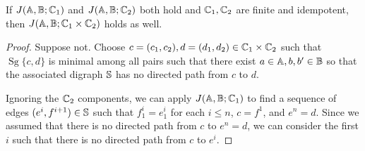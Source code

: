 \documentclass[letterpaper,11pt]{article}
\DeclareMathOperator{\Sg}{Sg}
\begin{document}
\begin{lem} If $J(\mathbb{A},\mathbb{B};\mathbb{C}_1)$ and $J(\mathbb{A},\mathbb{B};\mathbb{C}_2)$ both hold and $\mathbb{C}_1, \mathbb{C}_2$ are finite and idempotent, then $J(\mathbb{A},\mathbb{B};\mathbb{C}_1\times\mathbb{C}_2)$ holds as well.
\end{lem}
\begin{proof} Suppose not. Choose $c = (c_1,c_2), d = (d_1,d_2) \in \mathbb{C}_1 \times \mathbb{C}_2$ such that $\Sg\{c,d\}$ is minimal among all pairs such that there exist $a \in \mathbb{A}, b, b' \in \mathbb{B}$ so that the associated digraph $\mathbb{S}$ has no directed path from $c$ to $d$.

Ignoring the $\mathbb{C}_2$ components, we can apply $J(\mathbb{A},\mathbb{B};\mathbb{C}_1)$ to find a sequence of edges $(e^i,f^{i+1}) \in \mathbb{S}$ such that $f^i_1 = e^i_1$ for each $i \le n$, $c = f^1$, and $e^n = d$. Since we assumed that there is no directed path from $c$ to $e^n = d$, we can consider the first $i$ such that there is no directed path from $c$ to $e^i$.


\end{proof}
\end{document}

